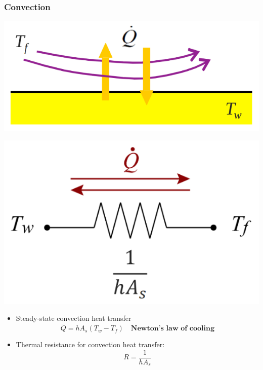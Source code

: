 \documentclass[11pt]{article}
\begin{document}
\subsubsection{Convection}
\label{sec:org77b3ac2}
\begin{center}
\includegraphics[scale=1]{./images/thermal-resistance-convection.png}
\end{center}
\begin{center}
\includegraphics[scale=1]{./images/thermal-resistance-convection-electrical-analogy.png}
\end{center}
\begin{itemize}
\item Steady-state convection heat transfer
\[\dot{Q} = h A_s (T_w - T_f) \quad \textbf{Newton's law of cooling}\]
\item Thermal resistance for convection heat transfer:
\[R = \frac{1}{h A_s}\]
\end{itemize}

 \newpage
\end{document}
